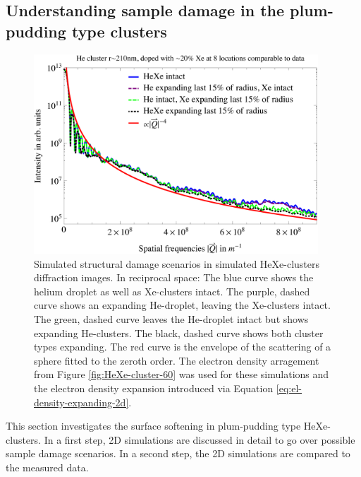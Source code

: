 \subsection{Understanding sample damage in the plum-pudding type clusters}\label{sec:helium-xenon-data}
\begin{figure}
	\centering
		\includegraphics[width=0.95\textwidth]{images/results/simulations-damage-explain3.png}
	\caption[Simulated structural damage scenarios in HeXe-clusters.]{Simulated structural damage scenarios in simulated HeXe-clusters diffraction images. In reciprocal space: The blue curve shows the helium droplet as well as Xe-clusters intact. The purple, dashed curve shows an expanding He-droplet, leaving the Xe-clusters intact. The green, dashed curve leaves the He-droplet intact but shows expanding He-clusters. The black, dashed curve shows both cluster types expanding. The red curve is the envelope of the scattering of a sphere fitted to the zeroth order. The electron density arragement from Figure \ref{fig:HeXe-cluster-60} was used for these simulations and the electron density expansion introduced via Equation \eqref{eq:el-density-expanding-2d}.}
	\label{fig:simulations-damage-explain}
\end{figure}
%
This section investigates the surface softening in plum-pudding type HeXe-clusters. In a first step, 2D simulations are discussed in detail to go over possible sample damage scenarios. In a second step, the 2D simulations are compared to the measured data.
